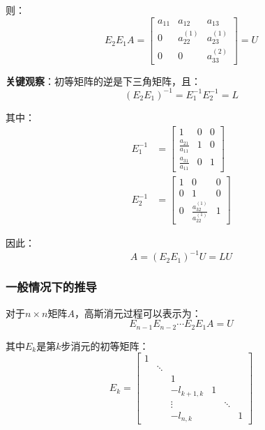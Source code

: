 \documentclass[12pt,a4paper]{article}
\begin{document}
则：
\begin{equation}
E_2 E_1 A = \begin{bmatrix} a_{11} & a_{12} & a_{13} \\ 0 & a_{22}^{(1)} & a_{23}^{(1)} \\ 0 & 0 & a_{33}^{(2)} \end{bmatrix} = U
\end{equation}

\textbf{关键观察}：初等矩阵的逆是下三角矩阵，且：
\begin{equation}
(E_2 E_1)^{-1} = E_1^{-1} E_2^{-1} = L
\end{equation}

其中：
\begin{align}
E_1^{-1} &= \begin{bmatrix} 1 & 0 & 0 \\ \frac{a_{21}}{a_{11}} & 1 & 0 \\ \frac{a_{31}}{a_{11}} & 0 & 1 \end{bmatrix} \\
E_2^{-1} &= \begin{bmatrix} 1 & 0 & 0 \\ 0 & 1 & 0 \\ 0 & \frac{a_{32}^{(1)}}{a_{22}^{(1)}} & 1 \end{bmatrix}
\end{align}

因此：
\begin{equation}
A = (E_2 E_1)^{-1} U = L U
\end{equation}

\subsubsection{一般情况下的推导}

对于$n \times n$矩阵$A$，高斯消元过程可以表示为：
\begin{equation}
E_{n-1} E_{n-2} \cdots E_2 E_1 A = U
\end{equation}

其中$E_k$是第$k$步消元的初等矩阵：
\begin{equation}
E_k = \begin{bmatrix}
1 & & & & & \\
& \ddots & & & & \\
& & 1 & & & \\
& & -l_{k+1,k} & 1 & & \\
& & \vdots & & \ddots & \\
& & -l_{n,k} & & & 1
\end{bmatrix}
\end{equation}
\end{document}
